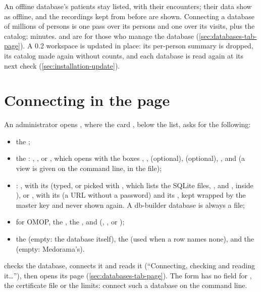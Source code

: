 An offline database's patients stay listed, with their encounters; their data show as offline,
and the recordings kept from before are shown. Connecting a database of millions of persons is
one pass over its persons and one over its visits, plus the catalog: minutes.
 and  are for those who manage the database
(\cref{sec:databases-tab-page}). A 0.2 workspace is updated in place: its per-person summary
is dropped, its catalog made again without counts, and each database is read again at its next
check (\cref{sec:installation-update}).

\section{Connecting in the page}
\label{sec:connecting-page}

An administrator opens , where the card , below the list,
asks for the following:
\begin{itemize}
\item the ;
\item the : , , or
  , which opens  with the boxes
  , ,  (optional),  (optional), ,
   and  (a  view is given on the command line, in
  the  file);
\item {}: , with its  (typed, or picked
  with , which lists the SQLite files, ,  and
  , inside ), or , with its  (a URL
  without a password) and its , kept wrapped by the master key and never shown
  again. A db-builder database is always a file;
\item for OMOP, the , the , and 
  (, , or );
\item the  (empty: the database itself), the 
  (used when a row names none), and the  (empty: Medorama's).
\end{itemize}
 checks the database, connects it and reads it (``Connecting, checking and reading
it\dots''), then opens its page (\cref{sec:databases-tab-page}). The form has no field for
, the certificate file or the limits: connect such a database on the command
line.

